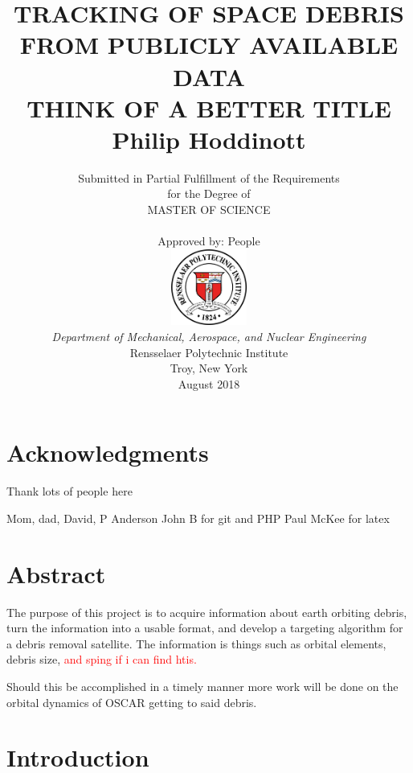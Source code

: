 \documentclass[12pt]{report}
\title{ 
		\LARGE \textbf{\uppercase{Tracking of space debris from publicly available data\\ Think of a better title}} \\
		\vspace{0.25cm}
		\LARGE \textbf{Philip Hoddinott}
	}
\author{\small{Submitted in Partial Fulfillment of the Requirements} \\ \small{for the Degree of} \\
		\uppercase{Master of Science} \\ \\
		Approved by: People\\
		\includegraphics[width=2.5cm]{rensselaer_seal.png} \\
		\small{\textit{Department of Mechanical, Aerospace, and Nuclear Engineering}} \\
		\small{Rensselaer Polytechnic Institute} \\ 
		\small{Troy, New York} \\
		\small{August 2018}
	}
\begin{document}
	\maketitle
	
	\setcounter{page}{2}
	\tableofcontents
	\listoftables
	\listoffigures
	
	\newpage
	\section{Acknowledgments}
	
	
	Thank lots of people here\par 
	
	Mom, dad, David,
	P Anderson
	John B for git and PHP
	Paul McKee for latex 
	
	
	
	

	
	
	\newpage
	\section{Abstract}
	The purpose of this project is to acquire information about earth orbiting debris, turn the information into a usable format, and develop a targeting algorithm for a debris removal satellite. The information is things such as orbital elements, debris size, \textcolor{red}{ and sping if i can find htis.} \par 
	 Should this be accomplished in a timely manner more work will be done on the orbital dynamics of OSCAR getting to said debris.
	\newpage
	\section{Introduction}
	
\end{document}
